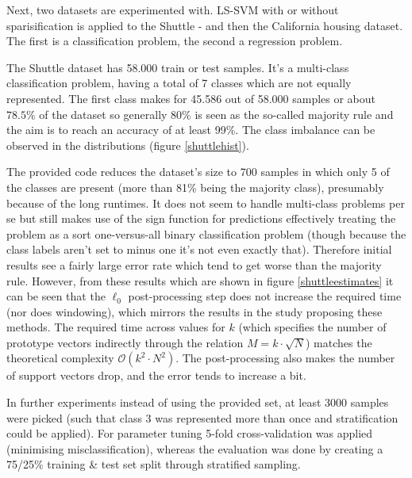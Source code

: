 
Next, two datasets are experimented with. LS-SVM with or without sparisification is applied to the Shuttle - and then the California housing dataset. The first is a classification problem, the second a regression problem.


The Shuttle dataset has 58.000 train or test samples. It's a multi-class classification problem, having a total of 7 classes which are not equally represented. The first class makes for 45.586 out of 58.000 samples or about $78.5\%$ of the dataset so generally 80\% is seen as the so-called majority rule and the aim is to reach an accuracy of at least 99\%. The class imbalance can be observed in the distributions (figure \ref{shuttlehist}).

\par The provided code reduces the dataset's size to 700 samples in which only 5 of the classes are present (more than 81\% being the majority class), presumably because of the long runtimes. It does not seem to handle multi-class problems per se but still makes use of the sign function for predictions effectively treating the problem as a sort one-versus-all binary classification problem (though because the class labels aren't set to minus one it's not even exactly that). Therefore initial results see a fairly large error rate which tend to get worse than the majority rule. However, from these results which are shown in figure \ref{shuttleestimates} it can be seen that the $\ell_0$ post-processing step does not increase the required time (nor does windowing), which mirrors the results in the study proposing these methods. The required time across values for $k$ (which specifies the number of prototype vectors indirectly through the relation $M=k\cdot\sqrt{N}$) matches the theoretical complexity $\mathcal{O}(k^2\cdot N^2)$. The post-processing also makes the number of support vectors drop, and the error tends to increase a bit.

\par In further experiments instead of using the provided set, at least 3000 samples were picked (such that class 3 was represented more than once and stratification could be applied). For parameter tuning 5-fold cross-validation was applied (minimising misclassification), whereas the evaluation was done by creating a 75/25\% training \& test set split through stratified sampling.


